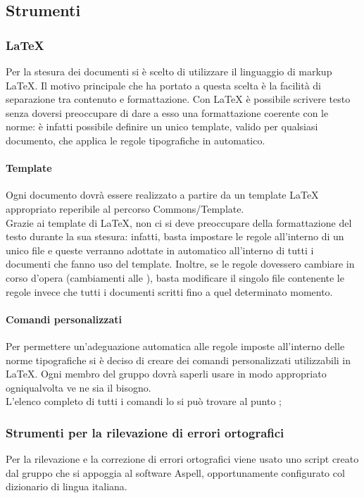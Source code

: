 	\subsection{Strumenti}
		\subsubsection{\LaTeX{}}
			Per la stesura dei documenti si è scelto di utilizzare il linguaggio di markup \LaTeX{}.  Il motivo principale che ha portato a questa scelta è la facilità di separazione tra contenuto e formattazione. Con \LaTeX{} è possibile scrivere testo senza doversi preoccupare di dare a esso una formattazione coerente con le norme: è infatti possibile definire un unico template, valido per qualsiasi documento, che applica le regole tipografiche in automatico.
			\paragraph{Template}
				Ogni documento dovrà essere realizzato a partire da un template \LaTeX{} appropriato reperibile al percorso Commons/Template.\\
				Grazie ai template di \LaTeX{}, non ci si deve preoccupare della formattazione del testo durante la sua stesura: infatti, basta impostare le regole all’interno di un unico file e queste verranno adottate in automatico all’interno di tutti i documenti che fanno uso del template. Inoltre, se le regole dovessero cambiare in corso d’opera (cambiamenti alle ), basta modificare il singolo file contenente le regole invece che tutti i documenti scritti fino a quel determinato momento.
			\paragraph{Comandi personalizzati}
				Per permettere un’adeguazione automatica alle regole imposte all’interno delle norme tipografiche si è deciso di creare dei comandi personalizzati utilizzabili in \LaTeX{}. Ogni membro del gruppo dovrà saperli usare in modo appropriato ogniqualvolta ve ne sia il bisogno.\\
				L’elenco completo di tutti i comandi lo si può trovare al punto ;
		\subsubsection{Strumenti per la rilevazione di errori ortografici}
			Per la rilevazione e la correzione di errori ortografici viene usato uno script creato dal gruppo \groupname{} che si appoggia al software Aspell, opportunamente configurato col dizionario di lingua italiana.
